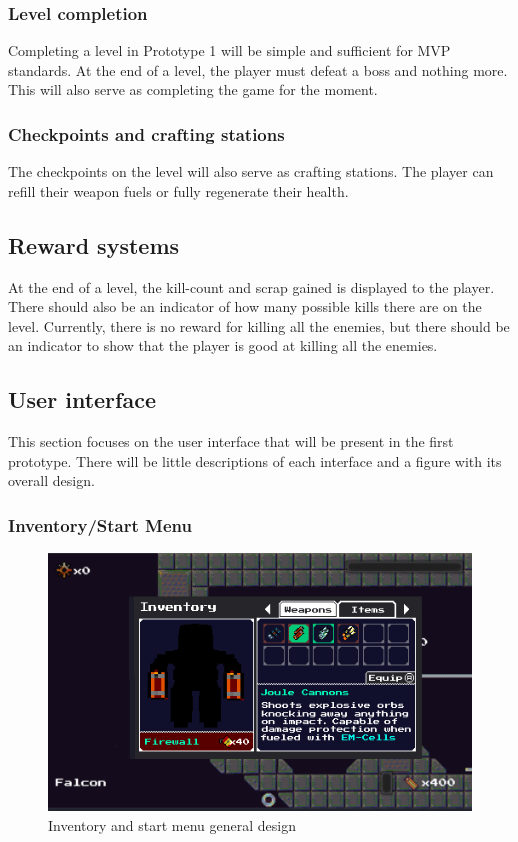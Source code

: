 \documentclass[../Main.tex]{subfiles}
\begin{document}
\subsubsection{Level completion}

Completing a level in Prototype 1 will be simple and sufficient for MVP standards. At the end of a level, the player must defeat a boss and nothing more. This will also serve as completing the game for the moment. 

\subsubsection{Checkpoints and crafting stations}

The checkpoints on the level will also serve as crafting stations. The player can refill their weapon fuels or fully regenerate their health.

\subsection{Reward systems}

At the end of a level, the kill-count and scrap gained is displayed to the player. There should also be an indicator of how many possible kills there are on the level. Currently, there is no reward for killing all the enemies, but there should be an indicator to show that the player is good at killing all the enemies. 

\subsection{User interface}

This section focuses on the user interface that will be present in the first prototype. There will be little descriptions of each interface and a figure with its overall design.

\subsubsection{Inventory/Start Menu}

\begin{figure}[H]
	\centering
	\includegraphics[width=\columnwidth]{Figures/InventoryUI.png}
	\caption{Inventory and start menu general design}
\end{figure}
\end{document}
